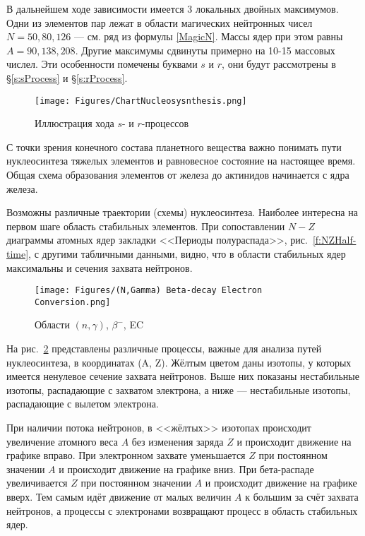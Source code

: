\documentclass[a5paper,openany]{book}
\begin{document}
	В дальнейшем ходе зависимости имеется 3 локальных двойных максимумов. Одни из элементов пар лежат в области магических нейтронных чисел $N = 50, 80, 126$ --- см. ряд из формулы \eqref{MagicN}. Массы ядер при этом равны $A = 90, 138, 208$. Другие максимумы сдвинуты примерно на 10-15 массовых числел. Эти особенности помечены  буквами $s$ и $r$, они будут рассмотрены в \S\ref{s:sProcess} и \S\ref{s:rProcess}.
	
	
\begin{figure}[h] 
	\centering\small
	\unitlength=1mm
	\texttt{[image: Figures/ChartNucleosysnthesis.png]} 
	\caption{Иллюстрация хода $s$- и $r$-процессов \cite{NuclearAstrophysics2022}} 
	\label{f:ChartNucleosysnthesis}
\end{figure}
	
	С точки зрения конечного состава планетного вещества важно понимать пути нуклеосинтеза тяжелых элементов и равновесное состояние на настоящее время. Общая схема образования элементов от железа до актинидов начинается с ядра железа.

Возможны различные траектории (схемы) нуклеосинтеза. Наиболее интересна на первом шаге область стабильных элементов. При сопоставлении $N-Z$ диаграммы атомных ядер закладки <<Периоды полураспада>>,  рис.~\ref{f:NZHalf-time}, с другими табличными данными, видно, что в области стабильных ядер максимальны и сечения захвата нейтронов. 
	
	\begin{figure}[h] 
		\centering\small
		\unitlength=1mm
		\texttt{[image: Figures/(N,Gamma) Beta-decay Electron Conversion.png]} 
		\caption{Области $(n,\gamma)$, $\beta^{-}$, EC} 
		\label{f:(N,Gamma) Beta-decay Electron Conversion}
	\end{figure}

 На рис.~\ref{f:(N,Gamma) Beta-decay Electron Conversion} представлены различные процессы, важные для анализа путей нуклеосинтеза, в координатах (A, Z). Жёлтым цветом даны изотопы, у которых имеется ненулевое сечение захвата нейтронов. Выше них показаны нестабильные изотопы, распадающие с захватом электрона, а ниже --- 
нестабильные изотопы, распадающие с вылетом электрона.

При наличии потока нейтронов, в <<жёлтых>> изотопах происходит увеличение атомного веса $A$ без изменения заряда $Z$ и происходит движение на графике вправо. При электронном захвате уменьшается $Z$ при постоянном значении $A$ и происходит движение на графике вниз. При бета-распаде увеличивается $Z$ при постоянном значении $A$ и происходит движение на графике вверх.
Тем самым идёт движение от малых величин $A$ к большим за счёт захвата нейтронов, а процессы с электронами возвращают процесс в область стабильных ядер.  
\end{document}
